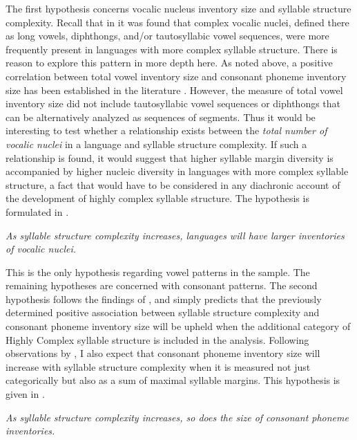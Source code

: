   The first hypothesis concerns vocalic nucleus inventory size and syllable structure complexity. Recall that in  it was found that complex vocalic nuclei, defined there as long vowels, diphthongs, and/or tautosyllabic vowel sequences, were more frequently present in languages with more complex syllable structure. There is reason to explore this pattern in more depth here. As noted above, a positive correlation between total vowel inventory size and consonant phoneme inventory size has been established in the literature \citep{Maddieson2011}. However, the measure of total vowel inventory size did not include tautosyllabic vowel sequences or diphthongs that can be alternatively analyzed as sequences of segments. Thus it would be interesting to test whether a relationship exists between the \textit{total number of vocalic nuclei} in a language and syllable structure complexity. If such a relationship is found, it would suggest that higher syllable margin diversity is accompanied by higher nucleic diversity in languages with more complex syllable structure, a fact that would have to be considered in any diachronic account of the development of highly complex syllable structure. The hypothesis is formulated in .

\ea\label{ex:4.2}
  \textit{As syllable structure complexity increases, languages will have larger inventories of vocalic nuclei.}
\z

  This is the only hypothesis regarding vowel patterns in the sample. The remaining hypotheses are concerned with consonant patterns. The second hypothesis follows the findings of \citet{Maddieson2006}, and simply predicts that the previously determined positive association between syllable structure complexity and consonant phoneme inventory size will be upheld when the additional category of Highly Complex syllable structure is included in the analysis. Following observations by \citet{Gordon2016}, I also expect that consonant phoneme inventory size will increase with syllable structure complexity when it is measured not just categorically but also as a sum of maximal syllable margins. This hypothesis is given in .

\ea\label{ex:4.3}
  \textit{As syllable structure complexity increases, so does the size of consonant phoneme inventories.}
\z

